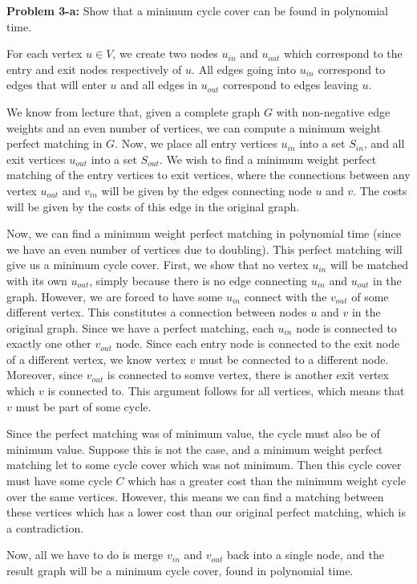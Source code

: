 \documentclass[psamsfonts]{amsart}
\newenvironment{sol}{\vspace{0.25cm}{\large \bfseries Solution:}}{\qedsymbol}
\newenvironment{prob}[1]{\begin{framed}{\large \bfseries Problem #1:}}{\end{framed}}
\begin{document}
\begin{prob}{3-a}
Show that a minimum cycle cover can be found in polynomial time.
\end{prob}
\begin{sol}
For each vertex $u \in V$, we create two nodes $u_{in}$ and $u_{out}$ which correspond to the entry and exit nodes respectively of $u$. All edges going into $u_{in}$ correspond to edges that will enter $u$ and all edges in $u_{out}$ correspond to edges leaving $u$.

We know from lecture that, given a complete graph $G$ with non-negative edge weights and an even number of vertices, we can compute a minimum weight perfect matching in $G$. Now, we place all entry vertices $u_{in}$ into a set $S_{in}$, and all exit vertices $u_{out}$ into a set $S_{out}$. We wish to find a minimum weight perfect matching of the entry vertices to exit vertices, where the connections between any vertex $u_{out}$ and $v_{in}$ will be given by the edges connecting node $u$ and $v$. The costs will be given by the costs of this edge in the original graph. 

Now, we can find a minimum weight perfect matching in polynomial time (since we have an even number of vertices due to doubling). This perfect matching will give us a minimum cycle cover. First, we show that no vertex $u_{in}$ will be matched with its own $u_{out}$, simply because there is no edge connecting $u_{in}$ and $u_{out}$ in the graph. However, we are forced to have some $u_{in}$ connect with the $v_{out}$ of some different vertex. This constitutes a connection between nodes $u$ and $v$ in the original graph. Since we have a perfect matching, each $u_{in}$ node is connected to exactly one other $v_{out}$ node. Since each entry node is connected to the exit node of a different vertex, we know vertex $v$ must be connected to a different node. Moreover, since $v_{out}$ is connected to somve vertex, there is another exit vertex which $v$ is connected to. This argument follows for all vertices, which means that $v$ must be part of some cycle. 

Since the perfect matching was of minimum value, the cycle must also be of minimum value. Suppose this is not the case, and a minimum weight perfect matching let to some cycle cover which was not minimum. Then this cycle cover must have some cycle $C$ which has a greater cost than the minimum weight cycle over the same vertices. However, this means we can find a matching between these vertices which has a lower cost than our original perfect matching, which is a contradiction.

Now, all we have to do is merge $v_{in}$ and $v_{out}$ back into a single node, and the result graph will be a minimum cycle cover, found in polynomial time.
\end{sol}
\end{document}
